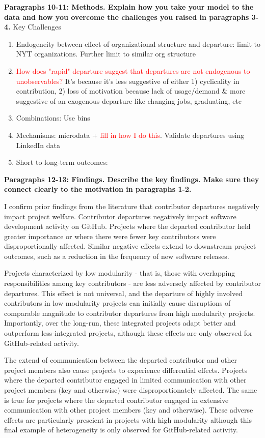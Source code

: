 \documentclass[source/paper/main.tex]{subfiles}
\begin{document}
\textbf{Paragraphs 10-11: Methods. Explain how you take your model to the data and how you overcome the challenges you raised in paragraphs 3-4.}
Key Challenges
\begin{enumerate}
    \item Endogeneity between effect of organizational structure and departure: limit to NYT organizations. Further limit to similar org structure 
    \item \textcolor{red}{How does "rapid" departure suggest that departures are not endogenous to unobservables? } It's because it's less suggestive of either 1) cyclicality in contribution, 2) loss of motivation because lack of usage/demand \& more suggestive of an exogenous departure like changing jobs, graduating, etc 
    \item Combinations: Use bins 
    \item Mechanisms: microdata + \textcolor{red}{fill in how I do this}. Validate departures using LinkedIn data
    \item Short to long-term outcomes: 
\end{enumerate}

\textbf{Paragraphs 12-13: Findings. Describe the key findings. Make sure they connect clearly to the motivation in paragraphs 1-2.}

I confirm prior findings from the literature that contributor departures negatively impact project welfare. Contributor departures negatively impact  software development activity on GitHub. Projects where the departed contributor held greater importance or where there were fewer key contributors were disproportionally affected. Similar negative effects extend to downstream project outcomes, such as a reduction in the frequency of new software releases.

Projects characterized by low modularity - that is, those with overlapping responsibilities among key contributors - are less adversely affected by contributor departures. This effect is not universal, and the departure of highly involved contributors in low modularity projects can initially cause disruptions of comparable magnitude to contributor departures from high modularity projects. Importantly, over the long-run, these integrated projects adapt better and outperform less-integrated projects, although these effects are only observed for GitHub-related activity. 

The extend of communication between the departed contributor and other project members also cause projects to experience differential effects. Projects where the departed contributor engaged in limited communication with other project members (key and otherwise) were disproportionately affected. The same is true for projects where the departed contributor engaged in extensive communication with other project members (key and otherwise). These adverse effects are particularly prescient in projects with high modularity although this final example of heterogeneity is only observed for GitHub-related activity. 
\end{document}

